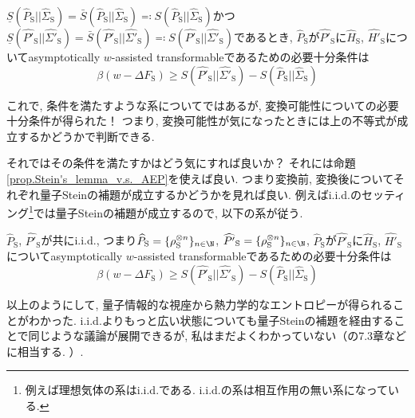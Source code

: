 \begin{mycor}
  $\underline{S}(\widehat{P}_{\text{S}}||\widehat{\Sigma}_{\text{S}})=\bar{S}(\widehat{P}_{\text{S}}||\widehat{\Sigma }_{\text{S}})\eqqcolon{S}(\widehat{P}_{\text{S}}||\widehat{\Sigma}_{\text{S}})$かつ$\underline{S}(\widehat{P'}_{\text{S}}||\widehat{\Sigma '}_{\text{S}})=\bar{S}(\widehat{P'}_{\text{S}}||\widehat{\Sigma '}_{\text{S}})\eqqcolon{S}(\widehat{P'}_{\text{S}}||\widehat{\Sigma '}_{\text{S}})$であるとき, 
  $\widehat{P}_{\text{S}}$が$\widehat{P'}_{\text{S}}$に$\widehat{H}_{\text{S}}$, $\widehat{H'}_{\text{S}}$についてasymptotically $w$-assisted transformableであるための必要十分条件は
  \begin{equation}
    \beta(w-\Delta F_{\text{S}})\geq {S}(\widehat{P'}_{\text{S}}||\widehat{\Sigma '}_{\text{S}}) - {S}(\widehat{P}_{\text{S}}||\widehat{\Sigma}_{\text{S}})
  \end{equation}
\end{mycor}

これで, 条件を満たすような系についてではあるが, 変換可能性についての必要十分条件が得られた！
つまり, 変換可能性が気になったときには上の不等式が成立するかどうかで判断できる. 

それではその条件を満たすかはどう気にすれば良いか？
それには命題\ref{prop.Stein's_lemma_v.s._AEP}を使えば良い. 
つまり変換前, 変換後についてそれぞれ量子Steinの補題が成立するかどうかを見れば良い. 
例えばi.i.d.のセッティング\footnote{例えば理想気体の系はi.i.d.である. i.i.d.の系は相互作用の無い系になっている. }では量子Steinの補題が成立するので, 以下の系が従う. 

\begin{mycor}
  $\widehat{P}_{\text{S}}$, $\widehat{P'}_{\text{S}}$が共にi.i.d., つまり$\widehat{P}_{\text{S}}=\{\rho_{\text{S}}^{\otimes n}\}_{n\in\N}$, $\widehat{P'}_{\text{S}}=\{\rho_{\text{S}}^{\otimes n}\}_{n\in\N}$,
  $\widehat{P}_{\text{S}}$が$\widehat{P'}_{\text{S}}$に$\widehat{H}_{\text{S}}$, $\widehat{H'}_{\text{S}}$についてasymptotically $w$-assisted transformableであるための必要十分条件は
  \begin{equation}
    \beta(w-\Delta F_{\text{S}})\geq {S}(\widehat{P'}_{\text{S}}||\widehat{\Sigma '}_{\text{S}}) - {S}(\widehat{P}_{\text{S}}||\widehat{\Sigma}_{\text{S}})
  \end{equation}
\end{mycor}

以上のようにして, 量子情報的な視座から熱力学的なエントロピーが得られることがわかった. 
i.i.d.よりもっと広い状態についても量子Steinの補題を経由することで同じような議論が展開できるが, 私はまだよくわかっていない（\cite{SagawaEntropy}の7.3章などに相当する. ）. 



